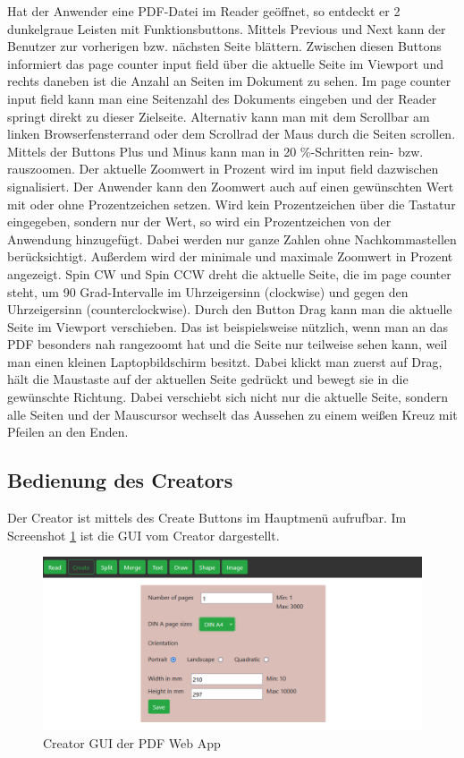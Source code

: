 Hat der Anwender eine PDF-Datei im Reader geöffnet, so entdeckt er 2 dunkelgraue Leisten mit Funktionsbuttons. Mittels Previous und Next kann der Benutzer zur vorherigen bzw. nächsten Seite blättern. Zwischen diesen Buttons informiert das page counter input field über die aktuelle Seite im Viewport und rechts daneben ist die Anzahl an Seiten im Dokument zu sehen. Im page counter input field kann man eine Seitenzahl des Dokuments eingeben und der Reader springt direkt zu dieser Zielseite. Alternativ kann man mit dem Scrollbar am linken Browserfensterrand oder dem Scrollrad der Maus durch die Seiten scrollen. Mittels der Buttons Plus und Minus kann man in 20 \%-Schritten rein- bzw. rauszoomen. Der aktuelle Zoomwert in Prozent wird im input field dazwischen signalisiert. Der Anwender kann den Zoomwert auch auf einen gewünschten Wert mit oder ohne Prozentzeichen setzen. Wird kein Prozentzeichen über die Tastatur eingegeben, sondern nur der Wert, so wird ein Prozentzeichen von der Anwendung hinzugefügt. Dabei werden nur ganze Zahlen ohne Nachkommastellen berücksichtigt. Außerdem wird der minimale und maximale Zoomwert in Prozent angezeigt. Spin CW und Spin CCW dreht die aktuelle Seite, die im page counter steht, um 90 Grad-Intervalle im Uhrzeigersinn (clockwise) und gegen den Uhrzeigersinn (counterclockwise). Durch den Button Drag kann man die aktuelle Seite im Viewport verschieben. Das ist beispielsweise nützlich, wenn man an das PDF besonders nah rangezoomt hat und die Seite nur teilweise sehen kann, weil man einen kleinen Laptopbildschirm besitzt. Dabei klickt man zuerst auf Drag, hält die Maustaste auf der aktuellen Seite gedrückt und bewegt sie in die gewünschte Richtung. Dabei verschiebt sich nicht nur die aktuelle Seite, sondern alle Seiten und der Mauscursor wechselt das Aussehen zu einem weißen Kreuz mit Pfeilen an den Enden.


\subsection{Bedienung des Creators}
Der Creator ist mittels des Create Buttons im Hauptmenü aufrufbar. Im Screenshot \ref{fig:creator} ist die GUI vom Creator dargestellt. 

\begin{figure}[!htbp]
	\centering
	\includegraphics[width=1\textwidth]{"images/creator.png"}
	\caption{Creator GUI der PDF Web App}
	\label{fig:creator}
\end{figure}

